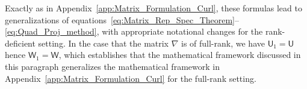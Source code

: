 \documentclass[english,12pt,jmp,graphicx]{revtex4-1}
\newcommand{\vecw}{\boldsymbol{w}}
\newcommand{\vecg}{\mathfrak{g}}
\newcommand{\appref}[1]{Appendix~\ref{#1}}
\newcommand{\bcdot}{\mbox{\boldmath${\cdot}$}}
\newcommand{\Sg}{\mathfrak{S}}
\newcommand{\Ag}{\mathfrak{A}}
\newcommand{\Hm}{\mathsf{H}}
\newcommand{\Um}{\mathsf{U}}
\newcommand{\Vm}{\mathsf{V}}
\newcommand{\Wm}{\mathsf{W}}
\newcommand{\Ib}{\mathsf{I}}
\newcommand{\Qc}{\mathcal{Q}}
\begin{document}
Exactly as in \appref{app:Matrix_Formulation_Curl}, these formulas
lead to generalizations of
equations~\eqref{eq:Matrix_Rep_Spec_Theorem}--\eqref{eq:Quad_Proj_method},
with appropriate notational changes for the rank-deficient setting.
In the case that the matrix $\nabla$
is of full-rank, we have $\Um_1=\Um$ hence $\Wm_1=\Wm$, which
establishes that the mathematical framework discussed in this
paragraph generalizes the mathematical framework in
\appref{app:Matrix_Formulation_Curl} for the full-rank setting.    
\end{document}
